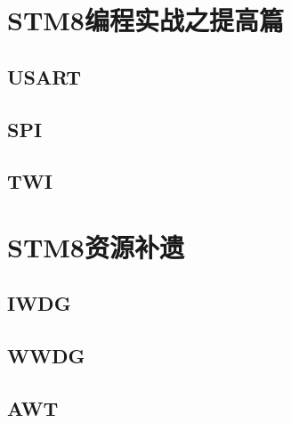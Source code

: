 \documentclass[a4paper]{book}
\newcommand{\prechap}{第}
\newcommand{\postchap}{章}
\newcommand{\chap}[1]{\newpage\thispagestyle{empty}\chapter{#1}\label{chap:\thechapter}}
\renewcommand{\appendixname}{}
\begin{document}
\chap{STM8编程实战之提高篇}

\section{USART}

\section{SPI}

\section{TWI}

\chap{STM8资源补遗}

\section{IWDG}

\section{WWDG}

\section{AWT}



\appendices
\renewcommand{\prechap}{\appendixname}
\renewcommand{\postchap}{}
\end{document}
